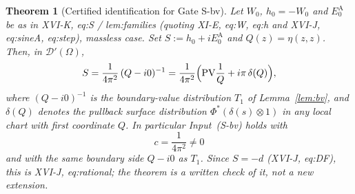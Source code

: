 \documentclass{article}
\newtheorem{theorem}[proposition]{Theorem}
\theoremstyle{remark}
\begin{document}
\begin{theorem}[Certified identification for Gate S-bv]
\label{thm:wpA-Sbv}
Let $W_0$, $h_0=-W_0$ and $E_0^{\mathrm A}$ be as in XVI-K, eq:S / lem:families (quoting XI-E, eq:W, eq:h and XVI-J, eq:sineA, eq:step), massless case.
Set $S:=h_0+iE_0^{\mathrm A}$ and $Q(z)=\eta(z,z)$.
Then, in $\mathcal D'(\Omega)$,
\begin{equation}
\label{eq:wpA-id}
S=\frac1{4\pi^2}\,(Q-i0)^{-1}
=\frac1{4\pi^2}\Bigl(\mathrm{PV}\frac1Q+i\pi\,\delta(Q)\Bigr),
\end{equation}
where $(Q-i0)^{-1}$ is the boundary-value distribution $T_1$ of Lemma~\ref{lem:bv}, and $\delta(Q)$ denotes the pullback surface distribution $\Phi^*(\delta(s)\otimes1)$ in any local chart with first coordinate $Q$.
In particular Input~(S-bv) holds with
\[
c=\frac1{4\pi^2}\neq0
\]
and with the same boundary side $Q-i0$ as $T_1$.
Since $S=-d$ (XVI-J, eq:DF), this is XVI-J, eq:rational; the theorem is a written check of it, not a new extension.
\end{theorem}
\end{document}
